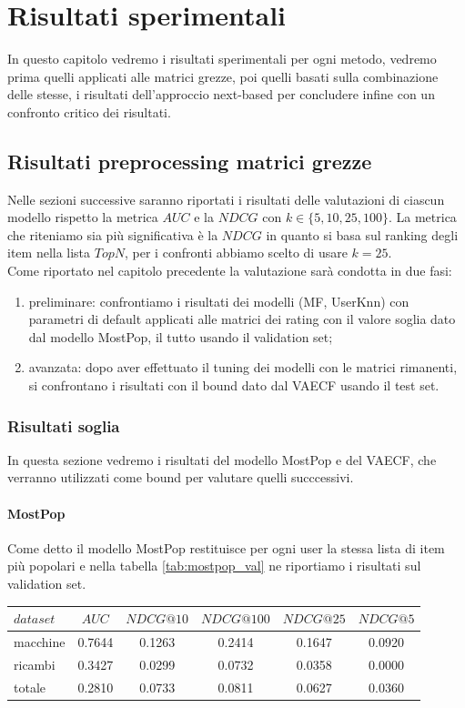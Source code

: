 \hypertarget{(chap:capitolo6)}{}
\chapter{Risultati sperimentali}
In questo capitolo vedremo i risultati sperimentali per ogni metodo, vedremo prima quelli applicati alle matrici grezze, poi quelli basati sulla combinazione delle stesse, i risultati dell'approccio next-based per concludere infine con un confronto critico dei risultati.
\section{Risultati preprocessing matrici grezze}
Nelle sezioni successive saranno riportati i risultati delle valutazioni di ciascun modello rispetto la metrica $AUC$ e la $NDCG$ con $k\in \{5, 10, 25, 100\}$.
La metrica che riteniamo sia più significativa è la $NDCG$ in quanto si basa sul ranking degli item nella lista $TopN$, per i confronti abbiamo scelto di usare $k=25$.\\
Come riportato nel capitolo precedente la valutazione sarà condotta in due fasi: 
\begin{enumerate}
    \item preliminare: confrontiamo i risultati dei modelli (MF, UserKnn) con parametri di default applicati alle matrici dei rating con il valore soglia dato dal modello MostPop, il tutto usando il validation set;
    \item avanzata: dopo aver effettuato il tuning dei modelli con le matrici rimanenti, si confrontano i risultati con il bound dato dal VAECF usando il test set.
\end{enumerate} 

\subsection{Risultati soglia}
In questa sezione vedremo i risultati del modello MostPop e del VAECF, che verranno utilizzati come bound per valutare quelli succcessivi. 

\subsubsection{MostPop}
Come detto il modello MostPop restituisce per ogni user la stessa lista di item più popolari e nella tabella \ref{tab:mostpop_val} ne riportiamo i risultati sul validation set.
\begin{center}
\begin{tabular}{|l|c|cccc|}
    \toprule
    $dataset$ &    $AUC$ &  $NDCG@10$ & $NDCG@100$  & $NDCG@25$ & $NDCG@5$  \\
    \midrule
    macchine & 0.7644 & 0.1263 &   0.2414 &  0.1647 & 0.0920 \\
    ricambi  & 0.3427 &  0.0299 &   0.0732 &  0.0358 & 0.0000 \\
    totale  & 0.2810 &  0.0733 &   0.0811 &  0.0627 & 0.0360 \\

\bottomrule
\end{tabular}
\label{tab:mostpop_val}
\end{center} 

